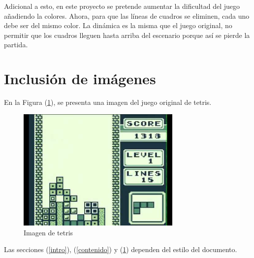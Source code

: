 \documentclass{article}
\begin{document}
Adicional a esto, en este proyecto se pretende aumentar la dificultad del juego añadiendo la colores. Ahora, para que las líneas de cuadros se eliminen, cada uno debe ser del mismo color. La dinámica es la misma que el juego original, no permitir que los cuadros lleguen hasta arriba del escenario porque así se pierde la partida.

\section{Inclusión de imágenes} \label{imagenes}

En la Figura (\ref{fig:tetris}), se presenta una imagen del juego original de tetris.

\begin{figure}[h]
\includegraphics[width=8cm]{tetris.jpg}
\centering
\caption{Imagen de tetris}
\label{fig:tetris}
\end{figure}

Las secciones (\ref{intro}), (\ref{contenido}) y (\ref{imagenes}) dependen del estilo del documento.
\end{document}
